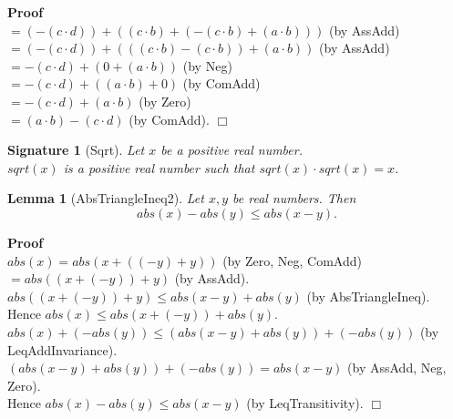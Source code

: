 \documentclass{article}
\newenvironment{forthel}{\begin{leftbar}}{\end{leftbar}}
\newenvironment{proof}{\noindent\textbf{Proof\ }}{\hspace*{\fill}$\Box$\medskip}
\newtheorem{lemma}{Lemma}
\newtheorem{signature}{Signature}
\newcommand{\dotequal}{=}
\begin{document}
\begin{forthel}
\begin{proof}
	\\$\dotequal (-(c \cdot d)) + ((c \cdot b) + (-(c \cdot b) + (a \cdot b)))$ (by AssAdd)
	\\$\dotequal (-(c \cdot d)) + (((c \cdot b) -(c \cdot b)) + (a \cdot b))$ (by AssAdd)
	\\$\dotequal -(c \cdot d) + (0 + (a \cdot b))$ (by Neg)
	\\$\dotequal -(c \cdot d) + ((a \cdot b) + 0)$ (by ComAdd)
	\\$\dotequal -(c \cdot d) + (a \cdot b)$ (by Zero)
	\\$\dotequal (a \cdot b) - (c \cdot d)$ (by ComAdd).
	\end{proof}
	
	
	
	\begin{signature}[Sqrt]
	Let $x$ be a positive real number. \\$sqrt(x)$ is a positive real number such that $sqrt(x) \cdot sqrt(x) = x$.
	\end{signature}
	
	\begin{lemma}[AbsTriangleIneq2]
	Let $x,y$ be real numbers. Then $$abs(x) - abs(y) \leq abs(x - y).$$
	\end{lemma}
	\begin{proof}\\
	$abs(x) \dotequal abs(x + ((-y) + y))$ (by Zero, Neg, ComAdd)
	\\$\dotequal abs((x + (-y)) + y)$ (by AssAdd).
	\\$abs((x + (-y)) + y) \leq abs(x - y) + abs(y)$ (by AbsTriangleIneq).
	\\Hence $abs(x) \leq abs(x + (-y)) + abs(y)$.
	\\$abs(x) + (-abs(y)) \leq (abs(x - y) + abs(y)) + (-abs(y))$ (by LeqAddInvariance).
	\\$(abs(x - y) + abs(y)) + (-abs(y)) = abs(x - y)$ (by AssAdd, Neg, Zero).
	\\Hence $abs(x) - abs(y) \leq abs(x - y)$ (by LeqTransitivity).
	\end{proof}
	

\end{forthel}
\end{document}
